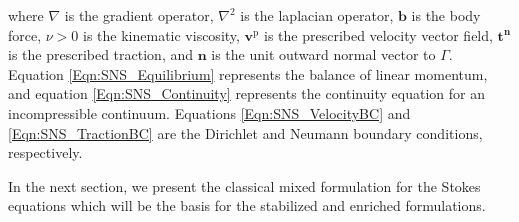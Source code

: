 \documentclass[11pt]{amsart}
\begin{document}
where $\nabla$ is the gradient operator, $\nabla^2$ is the laplacian operator, $\boldsymbol{b}$ is the body force, 
  $\nu > 0$ is the kinematic viscosity, $\boldsymbol{v}^{\mathrm{p}}$ is the 
  prescribed velocity vector field, $\boldsymbol{t}^{\boldsymbol{n}}$ is the 
  prescribed traction, and $\boldsymbol{n}$ is the unit outward normal vector 
  to $\Gamma$. Equation \eqref{Eqn:SNS_Equilibrium} represents the balance of 
  linear momentum, and equation \eqref{Eqn:SNS_Continuity} represents the continuity 
  equation for an incompressible continuum. Equations \eqref{Eqn:SNS_VelocityBC} 
  and \eqref{Eqn:SNS_TractionBC} are the Dirichlet and Neumann boundary 
  conditions, respectively. 
  


  In the next section, we present the classical mixed formulation for 
  the Stokes equations which will be the basis for the stabilized and enriched formulations. 
\end{document}

